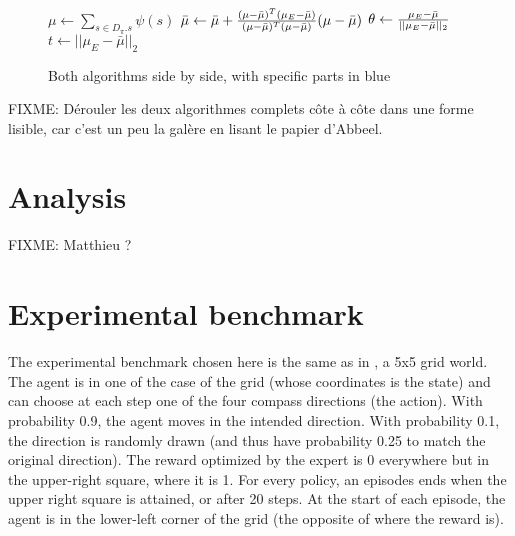 \documentclass{article}
\begin{document}
\begin{figure*}
\begin{minipage}[t]{.45\textwidth}
\begin{algorithm}[H]
\begin{algorithmic}[1]
{     \STATE $\mu \leftarrow \sum\limits_{s\in D_\pi.s}\psi(s)$
     }
     \STATE $\bar\mu \leftarrow \bar\mu + { (\mu-\bar\mu)^T (\mu_E-\bar\mu) \over (\mu-\bar\mu)^T (\mu-\bar\mu) } (\mu-\bar\mu) $ 
     \STATE $\theta \leftarrow 
       {\mu_E - \bar\mu\over ||\mu_E - \bar\mu||_2}$
     \STATE $ t\leftarrow ||\mu_E - \bar\mu||_2$
     \ENDWHILE
     \end{algorithmic}  
   \end{algorithm}
 \end{minipage}
 \hfill
 \caption{Both algorithms side by side, with specific parts in blue}
 \label{fig:alg}
\end{figure*}


FIXME: Dérouler les deux algorithmes complets côte à côte dans une forme lisible, car c'est un peu la galère en lisant le papier d'Abbeel.
\section{Analysis}
FIXME: Matthieu ?
\section{Experimental benchmark}
The experimental benchmark chosen here is the same as in \citep{ng2000algorithms}, a 5x5 grid world. The agent is in one of the case of the grid (whose coordinates is the state) and can choose at each step one of the four compass directions (the action). With probability 0.9, the agent moves in the intended direction. With probability 0.1, the direction is randomly drawn (and thus have probability 0.25 to match the original direction). The reward optimized by the expert is 0 everywhere but in the upper-right square, where it is 1. For every policy, an episodes ends when the upper right square is attained, or after 20 steps. At the start of each episode, the agent is in the lower-left corner of the grid (the opposite of where the reward is).\\
\end{document}
